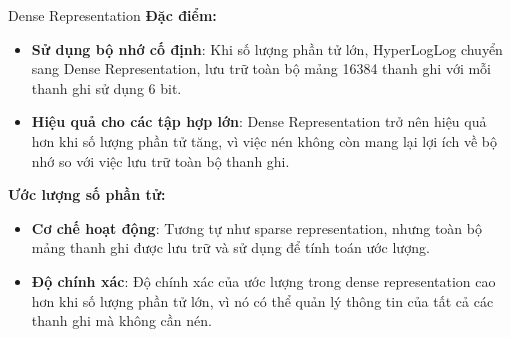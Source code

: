 \documentclass[10pt]{beamer}
\begin{document}
\begin{frame}[fragile]{Dense Representation}
  \textbf{Đặc điểm:}
  \begin{itemize}
    \item \textbf{Sử dụng bộ nhớ cố định}:  Khi số lượng phần tử lớn, 
    HyperLogLog chuyển sang Dense Representation, lưu trữ toàn bộ mảng 16384 
    thanh ghi với mỗi thanh ghi sử dụng 6 bit.
    \item \textbf{Hiệu quả cho các tập hợp lớn}: Dense Representation trở nên 
    hiệu quả hơn khi số lượng phần tử tăng, vì việc nén không còn mang lại 
    lợi ích về bộ nhớ so với việc lưu trữ toàn bộ thanh ghi.
  \end{itemize}
  \textbf{Ước lượng số phần tử:}
  \begin{itemize}
    \item \textbf{Cơ chế hoạt động}: Tương tự như sparse representation, 
    nhưng toàn bộ mảng thanh ghi được lưu trữ và sử dụng để tính toán 
    ước lượng.
    \item \textbf{Độ chính xác}: Độ chính xác của ước lượng trong 
    dense representation cao hơn khi số lượng phần tử lớn, vì nó có thể 
    quản lý thông tin của tất cả các thanh ghi mà không cần nén.
  \end{itemize}
\end{frame}
\end{document}
